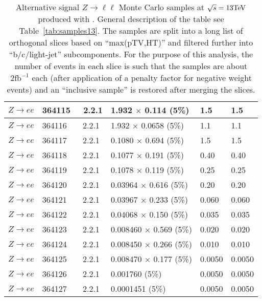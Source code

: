 \begin{table}[htbp]
\begin{center}
\begin{tabular}{l|l|l|l|l|l}
    			$ Z \to ee $ & 364115 & \Sherpa\ 2.2.1 & 1.932 $\times$ 0.114 (5\%)  & 1.5 & 1.5 \\\hline
    			$ Z \to ee $ & 364116 & \Sherpa\ 2.2.1 & 1.932 $\times$ 0.0658 (5\%)  & 1.1 & 1.1 \\\hline
    			$ Z \to ee $ & 364117 & \Sherpa\ 2.2.1 & 0.1080 $\times$ 0.694 (5\%)  & 1.5 & 1.5 \\\hline
    			$ Z \to ee $ & 364118 & \Sherpa\ 2.2.1 & 0.1077 $\times$ 0.191 (5\%)  & 0.40 & 0.40 \\\hline
    			$ Z \to ee $ & 364119 & \Sherpa\ 2.2.1 & 0.1078 $\times$ 0.119 (5\%)  & 0.25 & 0.25 \\\hline
    			$ Z \to ee $ & 364120 & \Sherpa\ 2.2.1 & 0.03964 $\times$ 0.616 (5\%)  & 0.20 & 0.20 \\\hline
    			$ Z \to ee $ & 364121 & \Sherpa\ 2.2.1 & 0.03967 $\times$ 0.233 (5\%)  & 0.060 & 0.060 \\\hline
    			$ Z \to ee $ & 364122 & \Sherpa\ 2.2.1 & 0.04068 $\times$ 0.150 (5\%)  & 0.035 & 0.035 \\\hline
    			$ Z \to ee $ & 364123 & \Sherpa\ 2.2.1 & 0.008460 $\times$ 0.569 (5\%)  & 0.020 & 0.020 \\\hline
    			$ Z \to ee $ & 364124 & \Sherpa\ 2.2.1 & 0.008450 $\times$ 0.266 (5\%)  & 0.010 & 0.010 \\\hline
    			$ Z \to ee $ & 364125 & \Sherpa\ 2.2.1 & 0.008470 $\times$ 0.177 (5\%)  & 0.0050 & 0.0050 \\\hline
    			$ Z \to ee $ & 364126 & \Sherpa\ 2.2.1 & 0.001760 (5\%)  & 0.0050 & 0.0050 \\\hline
    			$ Z \to ee $ & 364127 & \Sherpa\ 2.2.1 & 0.0001451 (5\%)  & 0.0050 & 0.0050 \\\hline
    		\end{tabular}
    		\caption{Alternative signal $Z\to\ell\ell$ Monte Carlo samples at
    			$\sqrt{s} = 13\text{Te\kern -0.1em V}$ produced with \Sherpa. General description of the table see
    			Table~\ref{tab:samples13}. The samples are split
    			into a long list of orthogonal slices based on ``max(pTV,HT)''
    			and filtered further into ``b/c/light-jet'' subcomponents. For
    			the purpose of this analysis, the number of events in each slice
    			is such that the samples are about $2\mathrm{fb}^{-1}$ each (after application
    			of a penalty factor for negative weight events) and
    			an ``inclusive sample'' is restored after merging the slices.}
    		\label{tab:samples13_sherpaz}
    	\end{center}
    \end{table}
    
